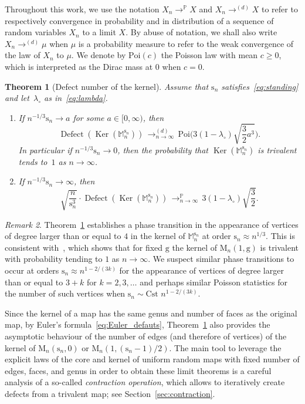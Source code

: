 \documentclass[JEP,XML,SOM,Unicode,NoFloatCountersInSection,NoEqCountersInSection]{cedram}
\theoremstyle{plain}
\newtheorem{theorem}{Theorem}
\theoremstyle{definition}
\theoremstyle{remark}
\newtheorem{remark}[theorem]{Remark}
\renewcommand{\P}{\mathbb{P}}
\newcommand{\Map}{\mathrm{M}}
\newcommand{\Mapb}{\mathbb{M}}
\newcommand{\gen}{\mathrm{g}}
\newcommand{\spar}{\mathrm{s}}
\DeclareMathOperator{\Ker}{Ker}
\DeclareMathOperator{\Defect}{Defect}
\newcommand{\cvloi}[1][n]{\,\mathop{\longrightarrow}^{(d)}_{#1 \to \infty}\,}
\newcommand{\cvproba}[1][n]{\,\mathop{\longrightarrow}^{\P}_{#1 \to \infty}\,}
\begin{document}
Throughout this work, we use the notation $X_n \displaystyle\mathop{\to}^\P X$ and $X_n \displaystyle\mathop{\to}^{(d)} X$ to refer to respectively convergence in probability and in distribution of a sequence of random variables $X_n$ to a limit $X$. By abuse of notation, we shall also write $X_n \displaystyle\mathop{\to}^{(d)} \mu$ when $\mu$ is a probability measure to refer to the weak convergence of the law of $X_n$ to $\mu$.
We denote by $\mathrm{Poi}(c)$ the Poisson law with mean $c \ge 0$, which is interpreted as the Dirac mass at $0$ when $c=0$.

\begin{theorem}[Defect number of the kernel]
\label{thm:defauts_ker}
Assume that $\spar_n$ satisfies~\eqref{eq:standing} and let~$\lambda_\circ$ as in~\eqref{eq:lambda}.
\begin{enumerate}
\item\label{thm:defauts_ker-Poisson} If $n^{-1/3} \spar_n \to a$ for some $a \in [0,\infty)$, then
\[
\Defect(\Ker(\Mapb_n^{\spar_{n}})) \cvloi \mathrm{Poi} \biggl(3 (1-\lambda_{\circ}) \sqrt{\frac{3}{2} a^3} \biggr).
\]
In particular if $n^{-1/3} \spar_n \to 0$, then the probability that $\Ker(\Mapb_n^{\spar_{n}})$ is trivalent tends to~$1$ as $n \to \infty$.

\item\label{thm:defauts_ker-Gaussien} If $n^{-1/3} \spar_n \to \infty$, then
\[
\sqrt{\frac{n}{\spar_n^{3}}} \cdot \Defect(\Ker(\Mapb_n^{\spar_{n}})) \cvproba 3 (1-\lambda_{\circ}) \sqrt{\frac{3}{2}}.
\]
\end{enumerate}
\end{theorem}

\begin{remark}
Theorem~\ref{thm:defauts_ker} establishes a phase transition in the appearance of vertices of degree larger than or equal to $4$ in the kernel of $ \Mapb_n^{\spar_n}$ at order $ \spar_n \approx n^{1/3}$. This is consistent with~\cite[Lem.\,3]{Cha10}, which shows that for fixed $\gen$ the kernel of $ \Map_{n}(1,\gen)$ is trivalent with probability tending to $1$ as $n \rightarrow \infty$. We suspect similar phase transitions to occur at orders $ \spar_n \approx n^{1- 2/(3k)}$ for the appearance of vertices of degree larger than or equal to $3+k$ for $k = 2,3, \dots$ and perhaps similar Poisson statistics for the number of such vertices when $ \spar_n \sim \text{Cst } n^{1- 2/(3k)}$.
\end{remark}

Since the kernel of a map has the same genus and number of faces as the original map, by Euler's formula~\eqref{eq:Euler_defauts}, Theorem~\ref{thm:defauts_ker} also provides the asymptotic behaviour of the number of edges (and therefore of vertices) of the kernel of $ \Map_{n}(\spar_{n},0)$ or \hbox{$\Map_{n}(1, (\spar_{n}-1)/2)$}.
The main tool to leverage the explicit laws of the core and kernel of uniform random maps with fixed number of edges, faces, and genus in order to obtain these limit theorems is a careful analysis of a so-called \emph{contraction operation}, which allows to iteratively create defects from a trivalent map; see Section~\ref{sec:contraction}.
\end{document}

